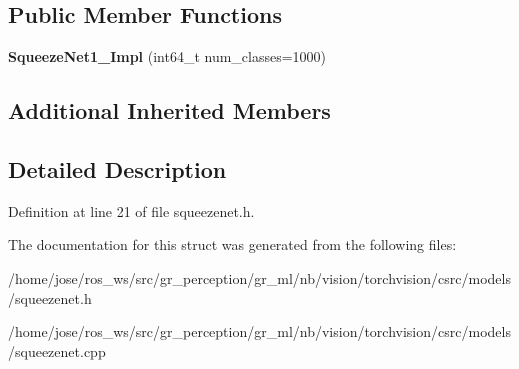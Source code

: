 \subsection*{Public Member Functions}
\begin{DoxyCompactItemize}
\item 
\mbox{\label{structvision_1_1models_1_1SqueezeNet1__0Impl_af1c4488a5050b499b131ac1ba8535092}} 
{\bfseries Squeeze\+Net1\+\_\+Impl} (int64\+\_\+t num\+\_\+classes=1000)
\end{DoxyCompactItemize}
\subsection*{Additional Inherited Members}


\subsection{Detailed Description}


Definition at line 21 of file squeezenet.\+h.



The documentation for this struct was generated from the following files\+:\begin{DoxyCompactItemize}
\item 
/home/jose/ros\+\_\+ws/src/gr\+\_\+perception/gr\+\_\+ml/nb/vision/torchvision/csrc/models/squeezenet.\+h\item 
/home/jose/ros\+\_\+ws/src/gr\+\_\+perception/gr\+\_\+ml/nb/vision/torchvision/csrc/models/squeezenet.\+cpp\end{DoxyCompactItemize}

